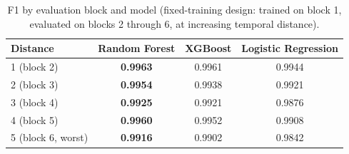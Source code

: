 \documentclass[10pt, a4paper, oneside]{article}
\begin{document}
\begin{table}[h]
\centering
\caption{F1 by evaluation block and model (fixed-training design: trained on block 1, evaluated on blocks 2 through 6, at increasing temporal distance).}
\label{tab:f1-by-block}
\setlength{\tabcolsep}{9pt}\begin{tabular}{lccc}
\toprule
Distance & Random Forest & XGBoost & Logistic Regression \\
\midrule
1 (block 2) & \textbf{0.9963} & 0.9961 & 0.9944 \\
2 (block 3) & \textbf{0.9954} & 0.9938 & 0.9921 \\
3 (block 4) & \textbf{0.9925} & 0.9921 & 0.9876 \\
4 (block 5) & \textbf{0.9960} & 0.9952 & 0.9908 \\
5 (block 6, worst) & \textbf{0.9916} & 0.9902 & 0.9842 \\
\bottomrule
\end{tabular}
\end{table}
\end{document}
